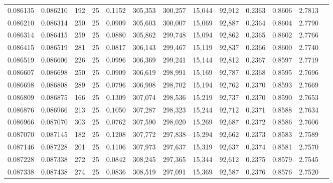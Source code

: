\begin{tabular}{rrrrrrrrrrrrr}
0.086135 & 0.086210 &   192 &  25 &                                     0.1152 & 305,353 & 300,257 &  15,044 &  92,912 & 0.2363 & 0.8606 & 2.7813 \\
0.086210 & 0.086314 &   250 &  25 &                                     0.0909 & 305,603 & 300,007 &  15,069 &  92,887 & 0.2364 & 0.8604 & 2.7790 \\
0.086314 & 0.086415 &   259 &  25 &                                     0.0880 & 305,862 & 299,748 &  15,094 &  92,862 & 0.2365 & 0.8602 & 2.7766 \\
0.086415 & 0.086519 &   281 &  25 &                                     0.0817 & 306,143 & 299,467 &  15,119 &  92,837 & 0.2366 & 0.8600 & 2.7740 \\
0.086519 & 0.086606 &   226 &  25 &                                     0.0996 & 306,369 & 299,241 &  15,144 &  92,812 & 0.2367 & 0.8597 & 2.7719 \\
0.086607 & 0.086698 &   250 &  25 &                                     0.0909 & 306,619 & 298,991 &  15,169 &  92,787 & 0.2368 & 0.8595 & 2.7696 \\
0.086698 & 0.086808 &   289 &  25 &                                     0.0796 & 306,908 & 298,702 &  15,194 &  92,762 & 0.2370 & 0.8593 & 2.7669 \\
0.086809 & 0.086875 &   166 &  25 &                                     0.1309 & 307,074 & 298,536 &  15,219 &  92,737 & 0.2370 & 0.8590 & 2.7653 \\
0.086876 & 0.086966 &   213 &  25 &                                     0.1050 & 307,287 & 298,323 &  15,244 &  92,712 & 0.2371 & 0.8588 & 2.7634 \\
0.086966 & 0.087070 &   303 &  25 &                                     0.0762 & 307,590 & 298,020 &  15,269 &  92,687 & 0.2372 & 0.8586 & 2.7606 \\
0.087070 & 0.087145 &   182 &  25 &                                     0.1208 & 307,772 & 297,838 &  15,294 &  92,662 & 0.2373 & 0.8583 & 2.7589 \\
0.087146 & 0.087228 &   201 &  25 &                                     0.1106 & 307,973 & 297,637 &  15,319 &  92,637 & 0.2374 & 0.8581 & 2.7570 \\
0.087228 & 0.087338 &   272 &  25 &                                     0.0842 & 308,245 & 297,365 &  15,344 &  92,612 & 0.2375 & 0.8579 & 2.7545 \\
0.087338 & 0.087438 &   274 &  25 &                                     0.0836 & 308,519 & 297,091 &  15,369 &  92,587 & 0.2376 & 0.8576 & 2.7520 \\

\end{tabular}
